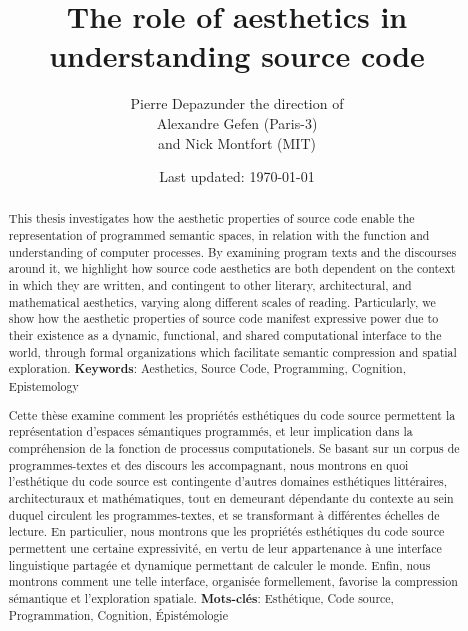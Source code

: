 \documentclass{report}
\begin{document}
\title{The role of aesthetics in understanding source code}
\author{Pierre Depaz\linebreak\linebreak under the direction of\\Alexandre Gefen (Paris-3)\\and Nick Montfort (MIT)}
\date{Last updated: \today}
\maketitle

\renewcommand{\abstractname}{Summary}
\begin{abstract}
    This thesis investigates how the aesthetic properties of source code enable the representation of programmed semantic spaces, in relation with the function and understanding of computer processes. By examining program texts and the discourses around it, we highlight how source code aesthetics are both dependent on the context in which they are written, and contingent to other literary, architectural, and mathematical aesthetics, varying along different scales of reading. Particularly, we show how the aesthetic properties of source code manifest expressive power due to their existence as a dynamic, functional, and shared computational interface to the world, through formal organizations which facilitate semantic compression and spatial exploration.
    \linebreak
    \linebreak
    \textbf{Keywords}: Aesthetics, Source Code, Programming, Cognition, Epistemology
\end{abstract}

\renewcommand{\abstractname}{Résumé}
\begin{abstract}
    Cette thèse examine comment les propriétés esthétiques du code source permettent la représentation d'espaces sémantiques programmés, et leur implication dans la compréhension de la fonction de processus computationels. Se basant sur un corpus de programmes-textes et des discours les accompagnant, nous montrons en quoi l'esthétique du code source est contingente d'autres domaines esthétiques littéraires, architecturaux et mathématiques, tout en demeurant dépendante du contexte au sein duquel circulent les programmes-textes, et se transformant à différentes échelles de lecture. En particulier, nous montrons que les propriétés esthétiques du code source permettent une certaine expressivité, en vertu de leur appartenance à une interface linguistique partagée et dynamique permettant de calculer le monde. Enfin, nous montrons comment une telle interface, organisée formellement, favorise la compression sémantique et l'exploration spatiale.
    \linebreak
    \linebreak
    \textbf{Mots-clés}: Esthétique, Code source, Programmation, Cognition, Épistémologie
\end{abstract}
\end{document}

